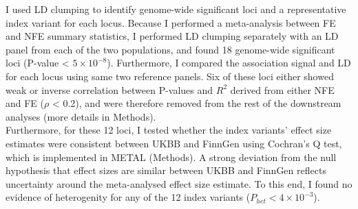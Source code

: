     I used LD clumping to identify genome-wide significant loci and a representative index variant for each locus. Because I performed a meta-analysis between FE and NFE summary statistics, I performed LD clumping separately with an LD panel from each of the two populations, and found 18 genome-wide significant loci (P-value < $5\times10^{-8}$). Furthermore, I compared the association signal and LD for each locus using same two reference panels. Six of these loci either showed weak or inverse correlation between P-values and $R^{2}$ derived from either NFE and FE ($\rho$ < 0.2), and were therefore removed from the rest of the downstream analyses (more details in Methods).\\
    
    Furthermore, for these 12 loci, I tested whether the index variants' effect size estimates were consistent between UKBB and FinnGen using Cochran's Q test, which is implemented in METAL (Methods). A strong deviation from the null hypothesis that effect sizes are similar between UKBB and FinnGen reflects uncertainty around the meta-analysed effect size estimate. To this end, I found no evidence of heterogenity for any of the 12 index variants ($P_{het} < 4\times10^{-3}$).

